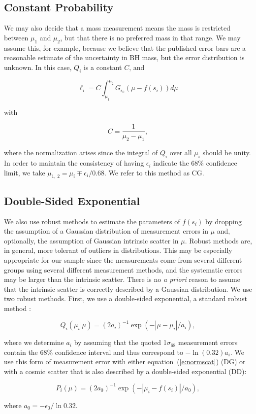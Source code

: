 \documentclass[twosided,letterpaper,numberedappendix]{emulateapj}
\newcommand{\beq}{
\begin{equation}
}
\newcommand{\eeq}{
\end{equation}
}
\newcommand{\sigmaconf}   {\ensuremath{\sigma_{68}}}
\begin{document}
\subsection{Constant Probability}
\label{cg}
We may also decide that a mass measurement means the mass is
restricted between $\mu_1$ and $\mu_2$, but that there is no preferred
mass in that range.  We may assume this, for example, because we
believe that the published error bars are a reasonable estimate of the
uncertainty in BH mass, but the error distribution is unknown.
In this case, $Q_i$ is a constant $C$, and
%
\beq
\ell_i = C \int_{\mu_1}^{\mu_2} G_{\epsilon_0} \left(\mu - f(s_i)\right) d\mu
\label{e:constproplike}
\eeq
%
with
%
\beq
C = \frac{1}{\mu_2 - \mu_1},
\eeq
%
where the normalization arises since the integral of $Q_i$ over all
$\mu_i$ should be unity.  In order to maintain the consistency of having
$\epsilon_i$ indicate the 68\% confidence limit, we take $\mu_{1,~2} =
\mu_i \mp \epsilon_i / 0.68$.  We refer to this method as CG.


\subsection{Double-Sided Exponential}
\label{dd}
We also use robust methods to estimate the parameters of $f(s_i)$ by
dropping the assumption of a Gaussian distribution of measurement
errors in $\mu$ and, optionally, the assumption of Gaussian intrinsic
scatter in $\mu$.  Robust methods are, in general, more tolerant of
outliers in distributions.  This may be especially appropriate for our
sample since the measurements come from several different groups using
several different measurement methods, and the systematic errors may
be larger than the intrinsic scatter.  There is no {\it a priori}
reason to assume that the intrinsic scatter is correctly described by
a Gaussian distribution.  We use two robust methods.  First, we use a
double-sided exponential, a standard robust method
\citep[e.g.,][]{numericalrecipes}:
%
\beq
Q_i(\mu_i | \mu) = \left(2 a_i\right)^{-1}\exp{\left(-\left| \mu - \mu_i \right|/a_i\right)},
\label{e:dblsidedexp}
\eeq
%
where we determine $a_i$ by assuming that the quoted 1$\sigmaconf$
measurement errors contain the 68\% confidence interval and thus
correspond to $-\ln{\left(0.32\right)}a_i$.  We use this form of measurement error
with either equation~(\ref{e:normscat}) (DG) or with a cosmic scatter
that is also described by a double-sided exponential (DD):
%
\beq
P_i(\mu) = \left(2 a_0\right)^{-1}\exp{\left(-\left| \mu_i - f(s_i) \right|/a_0\right)},
\label{e:dblsidedexpscat}
\eeq
%
where $a_0 = -\epsilon_0 / \ln{0.32}$.  
\end{document}
